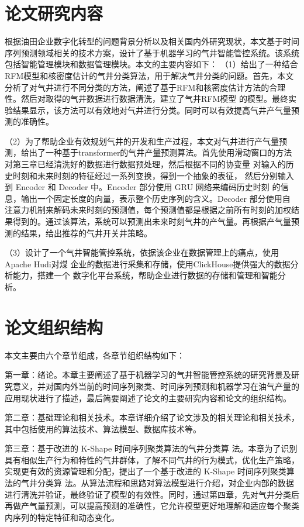\section{论文研究内容}
根据油田企业数字化转型的问题背景分析以及相关国内外研究现状，本文基于时间序列预测领域相关的技术方案，设计了基于机器学习的气井智能管控系统。该系统包括智能管理模块和数据管理模块。本文的主要内容如下：
（1）给出了一种结合RFM模型和核密度估计的气井分类算法，用于解决气井分类的问题。首先，本文分析了对气井进行不同分类的方法，阐述了基于RFM和核密度估计方法的合理性。然后对取得的气井数据进行数据清洗，建立了气井RFM模型
的模型。最终实验结果显示，该方法可以有效地对气井进行分类。同时可以有效提高气井产气量预测的准确性。

（2）为了帮助企业有效规划气井的开发和生产过程，本文对气井进行产气量预测，给出了一种基于transformer的气井产量预测算法。首先使用滑动窗口的方法对第三章已经清洗好的数据进行数据预处理，然后根据不同的协变量
对输入的历史时刻和未来时刻的特征经过一系列变换，得到一个抽象的表征，
然后分别输入到 Encoder 和 Decoder 中。Encoder 部分使用 GRU 网络来编码历史时刻
的信息，输出一个固定长度的向量，表示整个历史序列的含义。Decoder 部分使用自
注意力机制来解码未来时刻的预测值，每个预测值都是根据之前所有时刻的加权结
果得到的。通过该算法，系统可以预测出未来时刻气井的产气量。再根据产气量预测的结果，给出推荐的气井开关井策略。

（3）设计了一个气井智能管控系统，依据该企业在数据管理上的痛点，使用Apache Hudi对煤
企业的数据进行采集和存储，使用ClickHouse提供强大的数据分析能力，搭建一个
数字化平台系统，帮助企业进行数据的存储和管理和智能分析。
\section{论文组织结构}
本文主要由六个章节组成，各章节组织结构如下：

第一章：绪论。本章主要阐述了基于机器学习的气井智能管控系统的研究背景及研究意义，并对国内外当前的时间序列聚类、时间序列预测和机器学习在油气产量的应用现状进行了描述，最后简要阐述了论文的主要研究内容和论文的组织结构。

第二章：基础理论和相关技术。本章详细介绍了论文涉及的相关理论和相关技术，其中包括使用的算法技术、算法模型、数据库技术等。

第三章：基于改进的 K-Shape 时间序列聚类算法的气井分类算
法。本章为了识别具有相似生产行为和特性的气井群体，了解不同气井的行为模式，优化生产策略，实现更有效的资源管理和分配，提出了一个基于改进的 K-Shape 时间序列聚类算法的气井分类算
法。从算法流程和思路对算法模型进行介绍，对企业内部的数据进行清洗并验证，最终验证了模型的有效性。同时，通过第四章，先对气井分类后再做产气量预测，可以提高预测的准确性，它允许模型更好地理解和适应每个聚类内序列的特定特征和动态变化。

